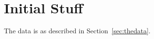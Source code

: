 \documentclass{article}\usepackage{knitr}
\begin{document}
% 
% 
%     
%     
% 
% 
% 
% 
%     
%     
%     
%     
%     
%     
%     
%     
%     
%     

\section{Initial Stuff}
\label{sec:initial}
The data is as described in Section~\ref{sec:thedata}.
\end{document}
